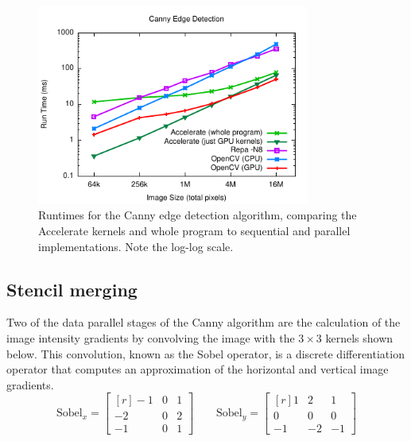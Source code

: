 \begin{figure}
    \begin{center}
        \includegraphics[width=0.8\textwidth]{images/sec-6/canny/canny}
    \end{center}
    \caption[Canny edge detection benchmarks]{Runtimes for the Canny edge
        detection algorithm, comparing the Accelerate kernels and whole program
        to sequential and parallel implementations. Note the log-log scale.}
    \label{fig:canny}
\end{figure}


\subsection{Stencil merging}

Two of the data parallel stages of the Canny algorithm are the calculation of
the image intensity gradients by convolving the image with the $3\times3$
kernels shown below. This convolution, known as the Sobel operator, is a
discrete differentiation operator that computes an approximation of the
horizontal and vertical image gradients.
%
\begin{equation*}
    \text{Sobel}_x =
        \begin{bmatrix*}[r]
          -1 & 0 & 1 \\
          -2 & 0 & 2 \\
          -1 & 0 & 1
        \end{bmatrix*}
    \qquad
    \text{Sobel}_y =
        \begin{bmatrix*}[r]
           1 &  2 &  1 \\
           0 &  0 &  0 \\
          -1 & -2 & -1
        \end{bmatrix*}
\end{equation*}

